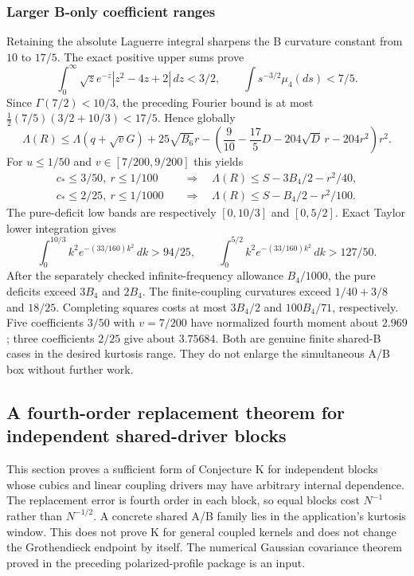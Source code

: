 \subsubsection{Larger B-only coefficient ranges}
Retaining the absolute Laguerre integral sharpens the B curvature
constant from $10$ to $17/5$. The exact positive upper sums prove
\[
 \int_0^\infty \sqrt z e^{-z}|z^2-4z+2|\,dz<3/2,
 \qquad \int s^{-3/2}\mu_4(ds)<7/5.
\]
Since $\Gamma(7/2)<10/3$, the preceding Fourier bound is at most
$\tfrac12(7/5)(3/2+10/3)<17/5$. Hence globally
\[
 \Lambda(R)\le\Lambda(q+\sqrt vG)+25\sqrt{B_6}r
 -\left(\frac9{10}-\frac{17}{5}D-204\sqrt D\,r-204r^2\right)r^2.
\]
For $u\le1/50$ and $v\in[7/200,9/200]$ this yields
\begin{align*}
 c_*\le3/50,\ r\le1/100
 &\quad\Longrightarrow\quad
 \Lambda(R)\le S-3B_4/2-r^2/40,\\
 c_*\le2/25,\ r\le1/1000
 &\quad\Longrightarrow\quad
 \Lambda(R)\le S-B_4/2-r^2/100.
\end{align*}
The pure-deficit low bands are respectively $[0,10/3]$ and $[0,5/2]$.
Exact Taylor lower integration gives
\[
 \int_0^{10/3}k^2e^{-(33/160)k^2}\,dk>94/25,\qquad
 \int_0^{5/2}k^2e^{-(33/160)k^2}\,dk>127/50.
\]
After the separately checked infinite-frequency allowance $B_4/1000$,
the pure deficits exceed $3B_4$ and $2B_4$. The finite-coupling
curvatures exceed $1/40+3/8$ and $18/25$. Completing squares costs
at most $3B_4/2$ and $100B_4/71$, respectively.
Five coefficients $3/50$ with $v=7/200$ have normalized fourth moment
about $2.969$; three coefficients $2/25$ give about $3.75684$.
Both are genuine finite shared-B cases in the desired kurtosis range.
They do not enlarge the simultaneous A/B box without further work.


\subsection{A fourth-order replacement theorem for independent shared-driver blocks}
\label{sec:gamma-block-replacement}

This section proves a sufficient form of Conjecture K for independent
blocks whose cubics and linear coupling drivers may have arbitrary
internal dependence.  The replacement error is fourth order in each
block, so equal blocks cost $N^{-1}$ rather than $N^{-1/2}$.
A concrete shared A/B family lies in the application's kurtosis window.
This does not prove K for general coupled kernels and does not change
the Grothendieck endpoint by itself.  The numerical Gaussian covariance
theorem proved in the preceding polarized-profile package is an input.

